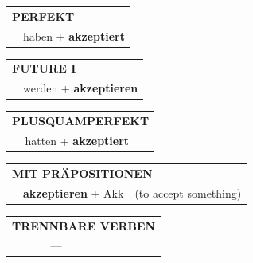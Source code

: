 \documentclass[10pt,a4paper]{revtex4-2}
\begin{document}
\begin{verbbox}
\vspace{10pt}

\begin{tabular}{rl}
\multicolumn{2}{l}{\textbf{PERFEKT}}\\
& haben + \textbf{akzeptiert}\\
\end{tabular}
\hfill
\begin{tabular}{rl}
\multicolumn{2}{l}{\textbf{FUTURE I}}\\
& werden + \textbf{akzeptieren}\\
\end{tabular}
\hfill
\begin{tabular}{rl}
\multicolumn{2}{l}{\textbf{PLUSQUAMPERFEKT}}\\
& hatten + \textbf{akzeptiert}\\
\end{tabular}

\vspace{10pt}

\begin{tabular}{lll}
\multicolumn{3}{l}{\textbf{MIT PRÄPOSITIONEN}}\\
& \textbf{akzeptieren} + Akk & (to accept something)\\
\end{tabular}
\hfill
\begin{tabular}{lll}
\multicolumn{3}{l}{\textbf{TRENNBARE VERBEN}}\\
& ---\\
\end{tabular}

\vspace{-5pt}
\end{verbbox}
\end{document}
